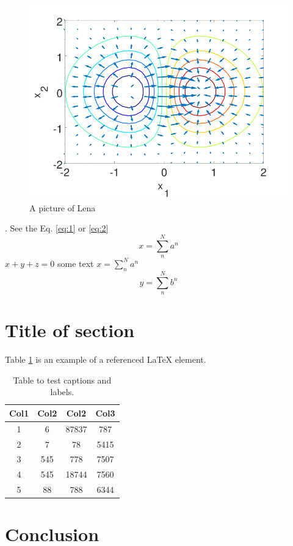\documentclass{../class/tecnia-uni-article}
\begin{document}
\lipsum[1-2]
\begin{figure}[!ht]
  \centering
  \includegraphics[width=0.85\linewidth]{screenshot.png}
  \caption{A picture of Lena}
\end{figure}
\lipsum[1]. See the Eq. \ref{eq:1} or \ref{eq:2}
\begin{equation}\label{eq:1}
x=\sum_{n}^{N}a^{n}
\end{equation}
\lipsum[1] $x+y+z=0$ some text $x=\sum_{n}^{N}a^{n}$ \lipsum[1] 
\begin{equation}\label{eq:2}
y=\sum_{n}^{N}b^{n}
\end{equation}

\section{Title of section}
\lipsum[1] 
Table \ref{table:1} is an example of a referenced \LaTeX{} element.

\begin{table}[h!]
\centering
\caption{Table to test captions and labels.}
\label{table:1}
\begin{tabular}{cccc} 
 \hline
 Col1 & Col2 & Col2 & Col3 \\ [0.5ex] 
 \hline\hline
 1 & 6 & 87837 & 787 \\ 
 2 & 7 & 78 & 5415 \\
 3 & 545 & 778 & 7507 \\
 4 & 545 & 18744 & 7560 \\
 5 & 88 & 788 & 6344 \\ [1ex] 
 \hline
\end{tabular}
\end{table}
\lipsum[1]

\section{Conclusion}
\lipsum[1] \cite{texbook} \cite{latex:companion}




\printbibliography[title=References]
\end{document}

